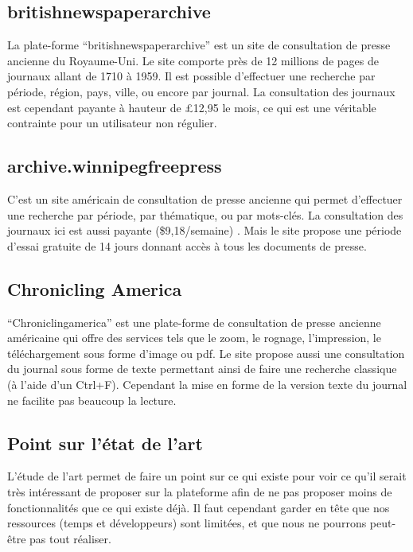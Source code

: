         \subsection{britishnewspaperarchive}
        \label{subsec:britishnewspaper}
        La plate-forme “britishnewspaperarchive” est un site de consultation de presse ancienne du Royaume-Uni.
        Le site comporte près de 12 millions de pages de journaux allant de 1710 à 1959. Il est possible
        d’effectuer une recherche par période, région, pays, ville, ou encore par journal. La consultation
        des journaux est cependant payante à hauteur de £12,95 le mois, ce qui est une véritable contrainte
        pour un utilisateur non régulier.

        \subsection{archive.winnipegfreepress}
        \label{subsec:winnipeg}
        C’est un site américain de consultation de presse ancienne qui permet d’effectuer une recherche par période,
        par thématique, ou par mots-clés. La consultation des journaux ici est aussi payante
        (\$9,18/semaine) . Mais le site propose une période d’essai gratuite de 14 jours donnant accès à tous les documents de presse.

        \subsection{Chronicling America}
        \label{subsec:chrinamerica}
        “Chroniclingamerica” est une plate-forme de consultation de presse ancienne américaine qui offre des services
        tels que le zoom, le rognage, l’impression, le téléchargement sous forme d’image ou pdf. Le site propose
        aussi une consultation du journal sous forme de texte permettant ainsi de faire une recherche classique
        (à l’aide d’un Ctrl+F). Cependant la mise en forme de la version texte du journal ne facilite pas beaucoup la lecture.


    \subsection{Point sur l’état de l’art}
    \label{sec:point}
    L’étude de l’art permet de faire un point sur ce qui existe pour voir ce qu’il serait très intéressant de proposer
    sur la plateforme afin de ne pas proposer moins de fonctionnalités que ce qui existe déjà. Il faut cependant garder
    en tête que nos ressources (temps et développeurs) sont limitées, et que nous ne pourrons peut-être pas tout réaliser.

